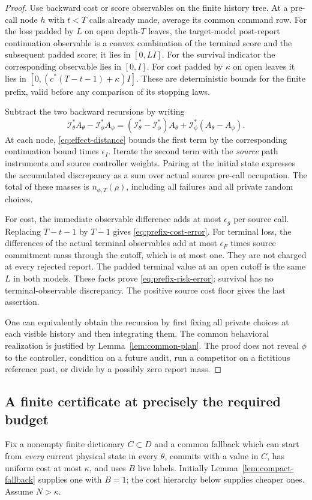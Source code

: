 \begin{proof}
Use backward cost or score observables on the finite history tree. At a pre-call node $h$ with $t<T$ calls already made, average its common command row. For the loss padded by $L$ on open depth-$T$ leaves, the target-model post-report continuation observable is a convex combination of the terminal score and the subsequent padded score; it lies in $[0,LI]$. For the survival indicator the corresponding observable lies in $[0,I]$. For cost padded by $\kappa$ on open leaves it lies in $[0,(c^*(T-t-1)+\kappa)I]$. These are deterministic bounds for the finite prefix, valid before any comparison of its stopping laws.

Subtract the two backward recursions by writing
\[
 \mathcal I_\theta^*A_\theta-\mathcal I_\phi^*A_\phi
 = (\mathcal I_\theta^*-\mathcal I_\phi^*)A_\theta
       +\mathcal I_\phi^*(A_\theta-A_\phi).
\]
At each node, \eqref{eq:effect-distance} bounds the first term by the corresponding continuation bound times $\epsilon_I$. Iterate the second term with the \emph{source} path instruments and source controller weights. Pairing at the initial state expresses the accumulated discrepancy as a sum over actual source pre-call occupation. The total of these masses is $n_{\phi,T}(\rho)$, including all failures and all private random choices.

For cost, the immediate observable difference adds at most $\epsilon_g$ per source call. Replacing $T-t-1$ by $T-1$ gives \eqref{eq:prefix-cost-error}. For terminal loss, the differences of the actual terminal observables add at most $\epsilon_F$ times source commitment mass through the cutoff, which is at most one. They are not charged at every rejected report. The padded terminal value at an open cutoff is the same $L$ in both models. These facts prove \eqref{eq:prefix-risk-error}; survival has no terminal-observable discrepancy. The positive source cost floor gives the last assertion.

One can equivalently obtain the recursion by first fixing all private choices at each visible history and then integrating them. The common behavioral realization is justified by Lemma~\ref{lem:common-plan}. The proof does not reveal $\phi$ to the controller, condition on a future audit, run a competitor on a fictitious reference past, or divide by a possibly zero report mass.
\end{proof}

\subsection{A finite certificate at precisely the required budget}
Fix a nonempty finite dictionary $C\subset D$ and a common fallback which can start from \emph{every} current physical state in every $\theta$, commits with a value in $C$, has uniform cost at most $\kappa$, and uses $B$ live labels. Initially Lemma~\ref{lem:compact-fallback} supplies one with $B=1$; the cost hierarchy below supplies cheaper ones. Assume $N>\kappa$.


